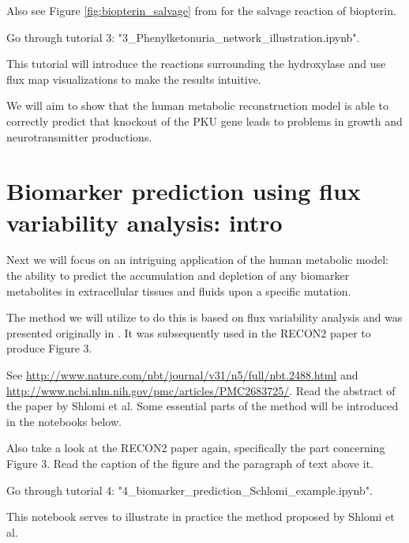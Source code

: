 \documentclass{article}
\begin{document}
Also see Figure \ref{fig:biopterin_salvage} from \cite{Lehninger_principlesBiochemistry} for the salvage reaction of biopterin.

\begin{tcolorbox}[width=\textwidth,colback={yellow},title={ASSIGNMENT},coltitle=white]

Go through tutorial 3: "3\_Phenylketonuria\_network\_illustration.ipynb".

This tutorial will introduce the reactions surrounding the hydroxylase and use flux map visualizations to make the results intuitive.

We will aim to show that the human metabolic reconstruction model is able to correctly predict that knockout of the PKU gene leads to problems in growth and neurotransmitter productions.

\end{tcolorbox}

\section{Biomarker prediction using flux variability a\-nalysis: intro}
Next we will focus on an intriguing application of the human metabolic model: the ability to predict the accumulation and depletion of any biomarker metabolites in extracellular tissues and fluids upon a specific mutation. 

The method we will utilize to do this is based on flux variability analysis and was presented originally in \cite{Shlomi2009}. It was subsequently used in the RECON2 paper to produce Figure 3.

\begin{tcolorbox}[width=\textwidth,colback={yellow},title={ASSIGNMENT},coltitle=white]

See \url{http://www.nature.com/nbt/journal/v31/n5/full/nbt.2488.html} and \url{http://www.ncbi.nlm.nih.gov/pmc/articles/PMC2683725/}. Read the abstract of the paper by Shlomi et al. Some essential parts of the method will be introduced in the notebooks below. 

Also take a look at the RECON2 paper again, specifically the part concerning Figure 3. Read the caption of the figure and the paragraph of text above it.
\end{tcolorbox}


\begin{tcolorbox}[width=\textwidth,colback={yellow},title={ASSIGNMENT},coltitle=white]

Go through tutorial 4: "4\_biomarker\_prediction\_Schlomi\_example.ipynb".

This notebook serves to illustrate in practice the method proposed by Shlomi et al.

\end{tcolorbox}
\end{document}

